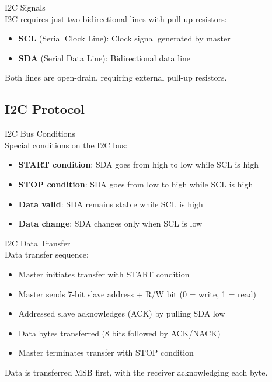 \begin{definition}{I2C Signals}\\
I2C requires just two bidirectional lines with pull-up resistors:
\begin{itemize}
    \item \textbf{SCL} (Serial Clock Line): Clock signal generated by master
    \item \textbf{SDA} (Serial Data Line): Bidirectional data line
\end{itemize}
Both lines are open-drain, requiring external pull-up resistors.
\end{definition}

\subsection{I2C Protocol}

\begin{concept}{I2C Bus Conditions}\\
Special conditions on the I2C bus:
\begin{itemize}
    \item \textbf{START condition}: SDA goes from high to low while SCL is high
    \item \textbf{STOP condition}: SDA goes from low to high while SCL is high
    \item \textbf{Data valid}: SDA remains stable while SCL is high
    \item \textbf{Data change}: SDA changes only when SCL is low
\end{itemize}
\end{concept}

\begin{definition}{I2C Data Transfer}\\
Data transfer sequence:
\begin{itemize}
    \item Master initiates transfer with START condition
    \item Master sends 7-bit slave address + R/W bit (0 = write, 1 = read)
    \item Addressed slave acknowledges (ACK) by pulling SDA low
    \item Data bytes transferred (8 bits followed by ACK/NACK)
    \item Master terminates transfer with STOP condition
\end{itemize}
Data is transferred MSB first, with the receiver acknowledging each byte.
\end{definition}

